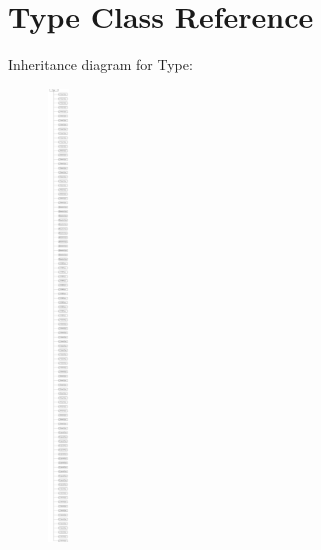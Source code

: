 \hypertarget{classType}{\section{Type Class Reference}
\label{classType}
}
Inheritance diagram for Type\-:\begin{figure}[H]
\begin{center}
\leavevmode
\includegraphics[height=12.000000cm]{classType}
\end{center}
\end{figure}
